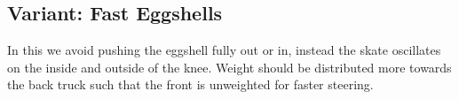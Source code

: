 \subsection*{Variant: Fast Eggshells}
\label{sec:sticky/eggshells/fast}

In this we avoid pushing the eggshell fully out or in, instead the skate oscillates on the inside and outside of the knee.  
Weight should be distributed more towards the back truck such that the front is unweighted for faster steering.   


